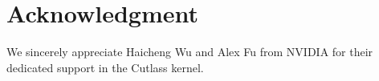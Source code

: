 \section*{Acknowledgment}

We sincerely appreciate Haicheng Wu and Alex Fu from NVIDIA for their dedicated support in the Cutlass kernel.